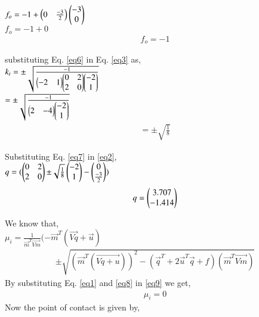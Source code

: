 \documentclass[journal,12pt,twocolumn]{IEEEtran}
\begin{document}
$f_o=-1+\begin{pmatrix}0 & \frac{-3}{2}\end{pmatrix}\begin{pmatrix}-3 \\ 0\end{pmatrix}$\\
$f_o=-1+0$\\
\vspace{0.30cm}
\begin{align}
f_o=-1           
\label{eq6}
\end{align}
\raggedright
substituting Eq. \eqref{eq6} in Eq. \eqref{eq3} as,\\
\centering
\vspace{0.3cm}
$k_i=\pm{\sqrt{\frac{-1}{\ensuremath{\begin{pmatrix}-2 & 1\end{pmatrix}}\ensuremath{\begin{pmatrix}0 & 2 \\ 2 & 0\end{pmatrix}}\ensuremath{\begin{pmatrix}-2 \\ 1\end{pmatrix}}}}}$\\
\vspace{0.25cm}
$=\pm{\sqrt{\frac{-1}{\ensuremath{\begin{pmatrix} 2 & -4\end{pmatrix}}\ensuremath{\begin{pmatrix} -2 \\ 1\end{pmatrix}}}}}$\\
\vspace{0.25cm}
\begin{align}
=\pm{\sqrt{\frac{1}{8}}}   
\label{eq7}
\end{align}
\vspace{0.3cm}            
\raggedright
Substituting Eq. \eqref{eq7} in \eqref{eq2},\\
\vspace{0.4cm}
\centering
$q=(\begin{pmatrix}0 & 2 \\ 2 & 0\end{pmatrix}{\pm{\sqrt{\frac{1}{8}}\ensuremath{\begin{pmatrix} -2 \\ 1\end{pmatrix}}}}-\begin{pmatrix}0 \\ \frac{-3}{2}\end{pmatrix})$\\
\vspace{0.35cm}
\begin{align}
q=\begin{pmatrix}3.707\\-1.414\end{pmatrix}
\label{eq8}
\end{align}
\raggedright
We know that,\\
\vspace{0.3cm}
$\mu_i=\frac{1}{\vec{m}^T\vec{Vm}}(-\vec{m}^T(\vec{Vq}+\vec{u})$
\begin{align}
\pm\sqrt{(\vec{m}^T(\vec{Vq+u}))^2-(\vec{q}^T+2\vec{u}^T\vec{q}+f)(\vec{m}^T\vec{Vm})}                 
\label{eq9}
\end{align}
By substituting Eq. \eqref{eq1} and \eqref{eq8} in \eqref{eq9} we get,\\
\begin{align}
\mu_i = 0
\label{eq10}
\end{align}
Now the point of contact is given by,\\
\end{document}
